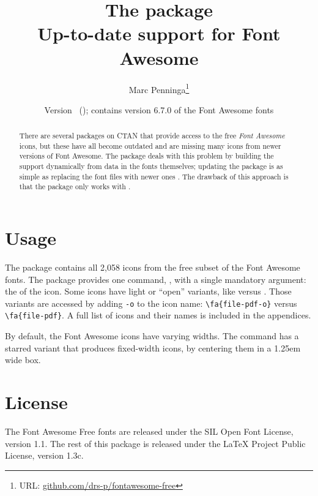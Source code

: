 \documentclass[10pt, a4paper]{ltxdoc}
\begin{document}
\title{The \textsf{\jobname} package\\Up-to-date  support for Font Awesome }
\author{Marc Penninga\thanks{URL: \href{https://github.com/drs-p/fontawesome-free}{ github.com/drs-p/fontawesome-free}}}
\makeatletter
\date{Version \fontawesome@free@version\ (\fontawesome@free@date); contains version 6.7.0 of the Font Awesome fonts}
\makeatother
\maketitle

\begin{abstract}
    There are several packages on CTAN that provide access to the free \emph{Font Awesome} icons, but these have all become outdated and are missing many icons from newer versions of Font Awesome.
    The \textsf{\jobname} package deals with this problem by building the  support dynamically from data in the fonts themselves; updating the package is as simple as replacing the font files with newer ones . The drawback of this approach is that the package only works with  .
\end{abstract}

\tableofcontents

\section{Usage}
The \textsf{\jobname} package contains all 2,058 icons from the free subset of the Font Awesome fonts. \DescribeMacro{\fa}The package provides one command, , with a single mandatory argument: the  of the icon. Some icons have light or ``open'' variants, like  versus . Those variants are accessed by adding \texttt{-o} to the icon name: \verb|\fa{file-pdf-o}| versus \verb|\fa{file-pdf}|. A full list of icons and their names is included in the appendices.

By default, the Font Awesome icons have varying widths. \DescribeMacro{\fa*}The  command has a starred variant  that produces fixed-width icons, by centering them in a 1.25em wide box.

\section*{License}
The Font Awesome Free fonts are released under the SIL Open Font License, version 1.1.
The rest of this package is released under the LaTeX Project Public License, version 1.3c.
\end{document}
